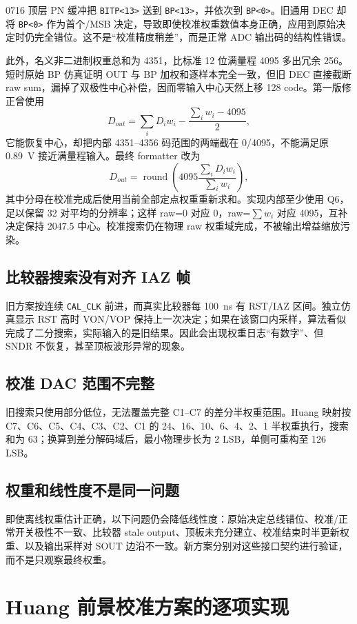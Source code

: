 \documentclass[UTF8,a4paper,11pt]{ctexart}
\newcommand{\code}[1]{\texttt{#1}}
\begin{document}
0716 顶层 PN 缓冲把 \code{BITP<13>} 送到 \code{BP<13>}，并依次到 \code{BP<0>}。旧通用 DEC 却将 \code{BP<0>} 作为首个/MSB 决定，导致即使校准权重数值本身正确，应用到原始决定时仍完全错位。这不是“校准精度稍差”，而是正常 ADC 输出码的结构性错误。

此外，名义非二进制权重总和为 4351，比标准 12 位满量程 4095 多出冗余 256。短时原始 BP 仿真证明 OUT 与 BP 加权和逐样本完全一致，但旧 DEC 直接截断 raw sum，漏掉了双极性中心补偿，因而零输入中心天然上移 128 code。第一版修正曾使用
\[
D_{out}=\sum_i D_iw_i-\frac{\sum_iw_i-4095}{2},
\]
它能恢复中心，却把内部 4351--4356 码范围的两端截在 0/4095，不能满足原 \SI{0.89}{V} 接近满量程输入。最终 formatter 改为
\[
D_{out}=\operatorname{round}\!\left(
4095\frac{\sum_iD_iw_i}{\sum_iw_i}
\right),
\]
其中分母在校准完成后使用当前全部定点权重重新求和。实现内部至少使用 Q6，足以保留 32 对平均的分辨率；这样 raw=0 对应 0，raw=$\sum w_i$ 对应 4095，互补决定保持 2047.5 中心。校准搜索仍在物理 raw 权重域完成，不被输出增益缩放污染。

\subsection{比较器搜索没有对齐 IAZ 帧}

旧方案按连续 \code{CAL\_CLK} 前进，而真实比较器每 \SI{100}{ns} 有 RST/IAZ 区间。独立仿真显示 RST 高时 VON/VOP 保持上一次决定；如果在该窗口内采样，算法看似完成了二分搜索，实际输入的是旧结果。因此会出现权重日志“有数字”、但 SNDR 不恢复，甚至顶板波形异常的现象。

\subsection{校准 DAC 范围不完整}

旧搜索只使用部分低位，无法覆盖完整 C1--C7 的差分半权重范围。Huang 映射按 C7、C6、C5、C4、C3、C2、C1 的 24、16、10、6、4、2、1 半权重执行，搜索和为 63；换算到差分解码域后，最小物理步长为 2 LSB，单侧可重构至 126 LSB。

\subsection{权重和线性度不是同一问题}

即使离线权重估计正确，以下问题仍会降低线性度：原始决定总线错位、校准/正常开关极性不一致、比较器 stale output、顶板未充分建立、校准结束时半更新权重、以及输出采样对 SOUT 边沿不一致。新方案分别对这些接口契约进行验证，而不是只观察最终权重。

\section{Huang 前景校准方案的逐项实现}
\end{document}
